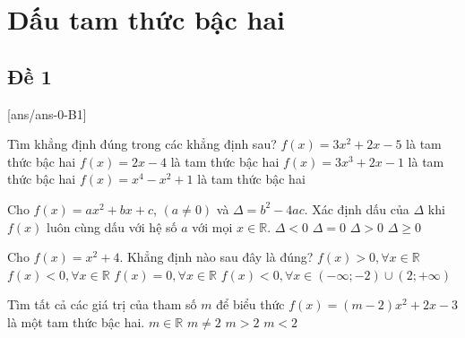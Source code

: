 \section{Dấu tam thức bậc hai}

\subsection{Đề 1}	
[ans/ans-0-B1]
\caulc
\begin{ex}%
	Tìm khẳng định đúng trong các khẳng định sau?
	\choice
	{\True $f(x)=3x^2+2x-5$ là tam thức bậc hai}
	{$f(x)=2x-4$ là tam thức bậc hai}
	{$f(x)=3x^3+2x-1$ là tam thức bậc hai}
	{$f(x)=x^4-x^2+1$ là tam thức bậc hai}
\end{ex}

\begin{ex}%
	Cho $f(x)=ax^2+bx+c$, $\left(a\ne 0\right)$ và $\Delta=b^2-4ac$. Xác định dấu của $\Delta$ khi $f(x)$ luôn cùng dấu với hệ số $a$ với mọi $x\in \mathbb{R}$.
	\choice
	{\True $\Delta < 0$}
	{$\Delta=0$}
	{$\Delta > 0$}
	{$\Delta \ge 0$}
\end{ex}

\begin{ex}%
	Cho $f(x)=x^2+4$. Khẳng định nào sau đây là đúng?
	\choice
	{\True $f(x) > 0,\forall x\in \mathbb{R}$}
	{$f(x) < 0,\forall x\in \mathbb{R}$}
	{$f(x)=0,\forall x\in \mathbb{R}$}
	{$f(x) < 0,\forall x\in \left(-\infty;-2\right)\cup \left(2;+\infty \right)$}
\end{ex}

\begin{ex}%
	Tìm tất cả các giá trị của tham số $m$ để biểu thức $f(x)=(m-2)x^2+2x-3$ là một tam thức bậc hai. 
	\choice
	{$m\in \mathbb{R}$}
	{\True $m\ne 2$}
	{$m > 2$}
	{$m < 2$}
\end{ex}

